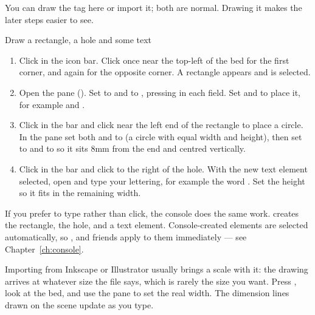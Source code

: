 You can draw the tag here or import it; both are normal. Drawing it makes the
later steps easier to see.

\begin{walkthrough}{Draw a rectangle, a hole and some text}
\begin{enumerate}[label=\arabic*.,leftmargin=1.4em]
  \item Click  in the  icon bar. Click once near the
        top-left of the bed for the first corner, and again for the opposite
        corner. A rectangle appears and is selected.
  \item Open the  pane (). Set
         to \cmd{60mm} and  to \cmd{30mm}, pressing
         in each field. Set  and  to place it, for
        example \cmd{20mm} and \cmd{20mm}.
  \item Click  in the  bar and click near the left end of
        the rectangle to place a circle. In the  pane set both
         and  to \cmd{4mm} (a circle with equal width and
        height), then set  to \cmd{26mm} and  to \cmd{33mm} so it
        sits 8\unit{mm} from the end and centred vertically.
  \item Click  in the  bar and click to the right of the
        hole. With the new text element selected, open 
        and type your lettering, for example the word . Set the
        height so it fits in the remaining width.
\end{enumerate}
\end{walkthrough}

\noindent If you prefer to type rather than click, the console does the same work.
 creates the rectangle, 
the hole, and  a text element. Console-created elements are
selected automatically, so ,  and friends apply to them
immediately --- see Chapter~\ref{ch:console}.

\begin{tipbox}
Importing from Inkscape or Illustrator usually brings a scale with it: the
drawing arrives at whatever size the file says, which is rarely the size you
want. Press , look at the bed, and use the  pane to
set the real width. The dimension lines drawn on the scene update as you type.
\end{tipbox}

